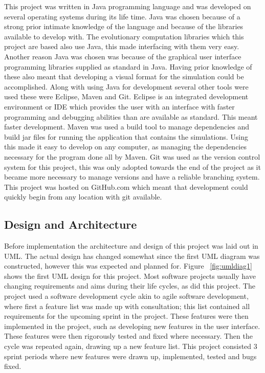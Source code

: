 \documentclass[12pt]{article}
\begin{document}
This project was written in Java programming language and was developed on several operating systems during its life time. 
Java was chosen because of a strong prior intimate knowledge of the language and because of the libraries available to develop with. 
The evolutionary computation libraries which this project are based also use Java, this made interfacing with them very easy. 
Another reason Java was chosen was because of the graphical user interface programming libraries supplied as standard in Java. 
Having prior knowledge of these also meant that developing a visual format for the simulation could be accomplished.  Along with using 
Java for development several other tools were used these were Eclipse, Maven and Git. Eclipse is an integrated development environment or 
IDE which provides the user with an interface with faster programming and debugging abilities than are available as standard.
This meant faster development. Maven was used a build tool to manage dependencies and build jar files for running the application 
that contains the simulations. Using this made it easy to develop on any computer, as managing the dependencies necessary for the 
program done all by Maven. Git was used as the version control system for this project, this was only adopted towards the 
end of the project as it became more necessary to manage versions and have a reliable branching system. This project was hosted 
on GitHub.com which meant that development could quickly begin from any location with git available. 

\subsection{Design and Architecture}

Before implementation the architecture and design of this project was laid out in UML. The actual design has changed somewhat since the first UML diagram was
constructed, however this was expected and planned for. Figure ~\ref{fig:umldiag1} shows the first UML design for this project.
Most software projects usually have changing requirements and aims during their life cycles, as did this project. The project 
used a software development cycle akin to agile software development, where first a feature list was made up with consultation; this
list contained all requirements for the upcoming sprint in the project. These features were then implemented in the project, such
as developing new features in the user interface. These features were then rigorously tested and fixed where necessary. Then 
the cycle was repeated again, drawing up a new feature list.  This project consisted 3 sprint periods where new features 
were drawn up, implemented, tested and bugs fixed.
\end{document}
